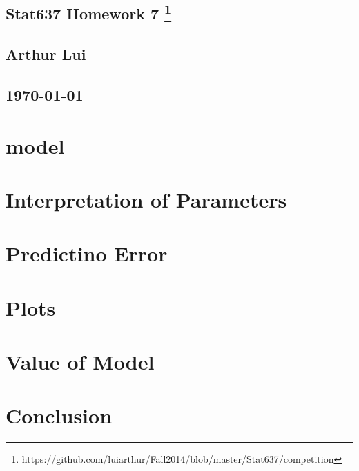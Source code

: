 \documentclass{article}
\begin{document}
\begin{center}
  \section*{\textbf{Stat637 Homework 7}
    \footnote{https://github.com/luiarthur/Fall2014/blob/master/Stat637/competition}
  }  
  \subsection*{\textbf{Arthur Lui}}
  \subsection*{\noindent\today}
\end{center}

\section{model}
\section{Interpretation of Parameters}
\section{Predictino Error}
\section{Plots}
\section{Value of Model}
\section{Conclusion}
\end{document}
